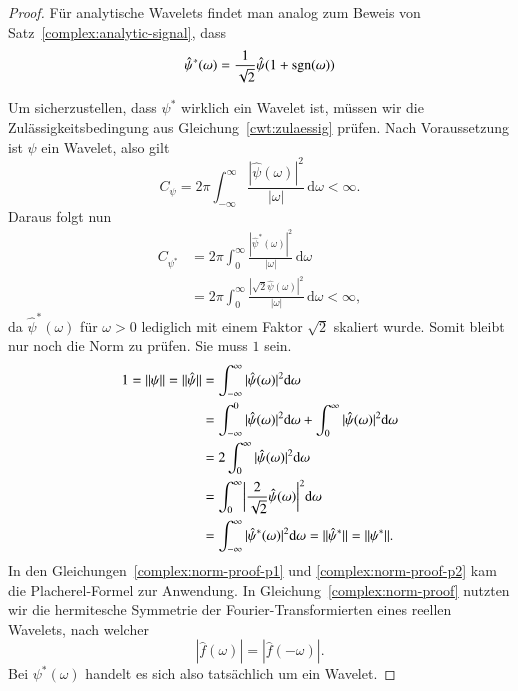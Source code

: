 \begin{proof}
	Für analytische Wavelets findet man analog zum Beweis von Satz~\ref{complex:analytic-signal}, dass
	\[\hat\psi^\ast(\omega) = \frac{1}{\sqrt{2}}\hat\psi(1 +\sgn(\omega))\]
	
	Um sicherzustellen, dass $\psi^\ast$ wirklich ein Wavelet ist, müssen wir die Zulässigkeitsbedingung aus Gleichung~\eqref{cwt:zulaessig} prüfen.
	Nach Voraussetzung ist $\psi$ ein Wavelet, also gilt
	\[
	C_{\psi}
	=
	2\pi
	\int_{-\infty}^\infty \frac{|\hat{\psi}(\omega)|^2}{|\omega|}\,\mathrm{d}\omega < \infty.
	\]
	Daraus folgt nun
	\begin{align}
	C_{\psi^\ast}
	&= 2\pi	\int_{0}^\infty \frac{|\hat{\psi}^\ast(\omega)|^2}{|\omega|}\,\mathrm{d}\omega \\
	&= 2\pi \int_{0}^\infty \frac{|\sqrt{2}\hat{\psi}(\omega)|^2}{|\omega|}\,\mathrm{d}\omega 
	< \infty,
	\end{align}
	da $\hat\psi^\ast(\omega)$ für $\omega > 0$ lediglich mit einem Faktor $\sqrt 2$ skaliert wurde.
	Somit bleibt nur noch die Norm zu prüfen.
	Sie muss $1$ sein.
	\begin{align}
		1 = \|\psi\| = \|\hat{\psi}\| 
		&= \int_{-\infty}^{\infty}|\hat{\psi}(\omega)|^2 \mathrm{d}\omega \label{complex:norm-proof-p1}\\
		&= \int_{-\infty}^{0}|\hat{\psi}(\omega)|^2 \mathrm{d}\omega +  \int_{0}^{\infty}|\hat{\psi}(\omega)|^2 \mathrm{d}\omega \notag\\
		&=  2\int_{0}^{\infty} |\hat{\psi}(\omega)|^2 \mathrm{d}\omega \label{complex:norm-proof}\\
		&=  \int_{0}^{\infty}\biggl|\frac{2}{\sqrt{2}}\hat{\psi}(\omega)\biggr|^2 \mathrm{d}\omega \notag\\
		&=  \int_{-\infty}^{\infty}|\hat{\psi}^\ast(\omega)|^2 \mathrm{d}\omega 
		= \|\hat{\psi}^\ast\| = \|\psi^\ast\|.\label{complex:norm-proof-p2}
	\end{align}
	In den Gleichungen~\eqref{complex:norm-proof-p1} und \eqref{complex:norm-proof-p2} kam die Placherel-Formel zur Anwendung.
	In Gleichung~\eqref{complex:norm-proof} nutzten wir die hermitesche Symmetrie der Fourier-Transformierten eines reellen Wavelets, nach welcher
	\[|\hat{f}(\omega)| = |\hat{f}(-\omega)|.\]
	Bei $\psi^\ast(\omega)$ handelt es sich also tatsächlich um ein Wavelet.
\end{proof}
